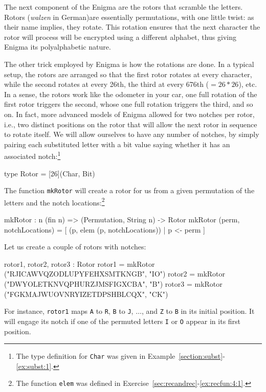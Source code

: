 The next component of the Enigma are the rotors that scramble the
letters.  Rotors (\textit{walzen} in German)\indEnigmaRotor are
essentially permutations, with one little twist: as their name
implies, they rotate. This rotation ensures that the next character
the rotor will process will be encrypted using a different alphabet,
thus giving Enigma its polyalphabetic nature.\indPolyAlphSubst

The other trick employed by Enigma is how the rotations are done. In a
typical setup, the rotors are arranged so that the first rotor rotates
at every character, while the second rotates at every 26th, the third
at every 676th ($=26*26$), etc. In a sense, the rotors work like the
odometer in your car, one full rotation of the first rotor triggers
the second, whose one full rotation triggers the third, and so on. In
fact, more advanced models of Enigma allowed for two notches per
rotor, i.e., two distinct positions on the rotor that will allow the
next rotor in sequence to rotate itself. We will allow ourselves to
have any number of notches, by simply pairing each substituted letter
with a bit value saying whether it has an associated
notch:\footnote{The type definition for {\tt Char} was given in
  Example~\ref{section:subst}-\ref{ex:subst:1}.}

\begin{code}
  type Rotor = [26](Char, Bit)
\end{code}
The function {\tt mkRotor} will create a rotor for us from a given permutation of the letters and the notch
locations:\footnote{The function {\tt elem} was defined in Exercise~\ref{sec:recandrec}-\ref{ex:recfun:4:1}.\indElem}
\begin{code}
  mkRotor : {n} (fin n) => (Permutation, String n) -> Rotor
  mkRotor (perm, notchLocations) = [ (p, elem (p, notchLocations))
                                    | p <- perm
                                   ]
\end{code}
Let us create a couple of rotors with notches:
\begin{code}
  rotor1, rotor2, rotor3 : Rotor
  rotor1 = mkRotor ("RJICAWVQZODLUPYFEHXSMTKNGB", "IO")
  rotor2 = mkRotor ("DWYOLETKNVQPHURZJMSFIGXCBA", "B")
  rotor3 = mkRotor ("FGKMAJWUOVNRYIZETDPSHBLCQX", "CK")
\end{code}
For instance, {\tt rotor1} maps {\tt A} to {\tt R}, {\tt B} to {\tt J},
$\ldots$, and {\tt Z} to {\tt B} in its initial position. It will engage its
notch if one of the permuted letters {\tt I} or {\tt O} appear in its first
position.

